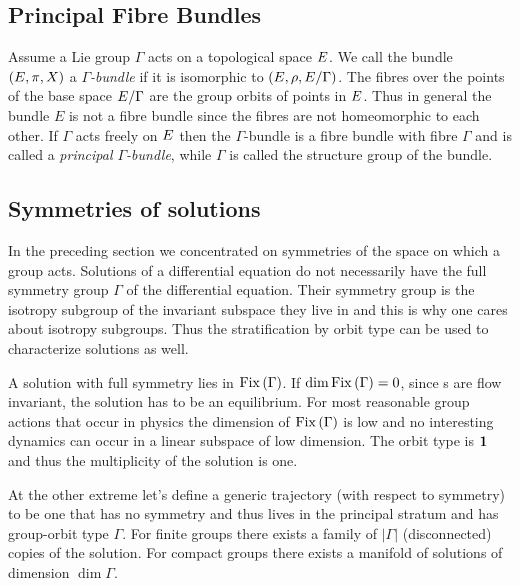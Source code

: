 \subsection{Principal Fibre Bundles}

Assume a Lie group $\Gamma$ acts on a topological space $E$. We call the bundle $(E,\pi,X)$ a \emph{$\Gamma$-bundle} if it is isomorphic to $(E,\rho,E/\Gamma)$. The fibres over the points of the base space $E/\Gamma$ are the group orbits of points in $E$. 
Thus in general  the bundle $E$ is not a fibre bundle since the fibres are not homeomorphic to each other. If $\Gamma$ acts freely on
$E$ then the $\Gamma$-bundle is a fibre bundle with fibre $\Gamma$ and is called a \emph{principal $\Gamma$-bundle}, while $\Gamma$ is called the structure group of the bundle.

\subsection{Symmetries of solutions}

In the preceding section we concentrated on symmetries of the space on which a group acts.
Solutions of a differential equation do not necessarily have the full symmetry group $\Gamma$ of the differential 
equation. Their symmetry group is the isotropy subgroup of the invariant subspace they live in and this is
why one cares about isotropy subgroups. Thus the stratification by orbit type can be used to characterize
solutions as well.

A solution with full symmetry lies in $\mathrm{Fix}\left(\Gamma\right)$. If $\dim\mathrm{Fix}\left(\Gamma\right)=0$, since \fixedsp s are flow
invariant, the solution has to be an equilibrium. For most reasonable group actions that occur in physics the dimension of $\mathrm{Fix}\left(\Gamma\right)$ is low and no interesting dynamics can occur in a linear subspace of low dimension.
The orbit type is $\mathbf{1}$ and thus the multiplicity of the solution is one. 

At the other extreme let's define a generic trajectory (with respect to symmetry) to be one that has no
symmetry and thus lives in the principal stratum and has group-orbit type $\Gamma$. For finite groups there exists a family of $|\Gamma|$ (disconnected) copies of the solution. For compact groups there exists a manifold of solutions of dimension $\dim \Gamma$.


